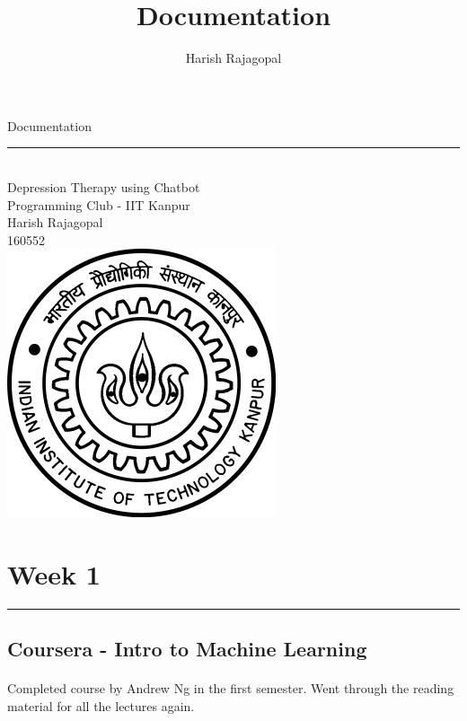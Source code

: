 \documentclass{article}
\title{Documentation}
\author{Harish Rajagopal}
\begin{document}
    \begin{titlepage}
    	\begin{center}
    		{\fontsize{50}{60}\selectfont Documentation}
    		{\rule{10cm}{1pt}}\\[2.5cm]
    		{\fontsize{22}{30}\selectfont Depression Therapy using Chatbot}\\[+3mm]
    		{\fontsize{19}{25}\selectfont Programming Club - IIT Kanpur}\\[+2cm]
    		{\fontsize{17}{25}\selectfont Harish Rajagopal\\[+2mm]
    			160552}\\[+5.5cm]
    		\includegraphics*[scale=0.3]{iitklogo.png}
    	\end{center}
    \end{titlepage}
    
    \newpage
    \section*{\fontsize{25}{30}\selectfont \textbf{Week 1}}
        
        \vspace{-3mm}
        \rule{12cm}{0.5pt}
        \vspace{+6mm}
        \subsection*{\fontsize{16}{20}\selectfont Coursera - Intro to Machine Learning}
        	\vspace{+1mm}\paragraph{}{\fontsize{13}{16}\selectfont Completed course by Andrew Ng in the first semester. Went through the reading material for all the lectures again.}\\[-2mm]
        
\end{document}
